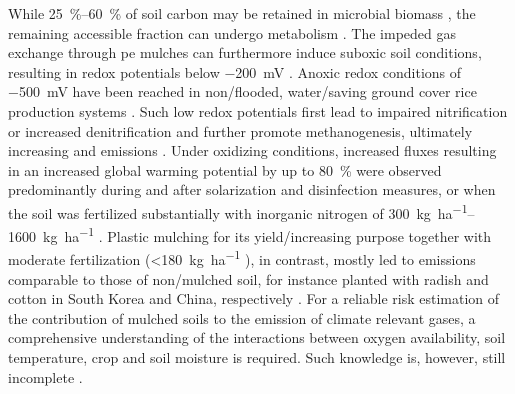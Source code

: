 While \SIrange[range-phrase = { to }]{25}{60}{\percent} of soil carbon may be retained in microbial biomass \citep{AnCarbon2015}, the remaining accessible fraction can undergo metabolism \citep{ZhouRidgefurrow2012}. The impeded gas exchange through \ac{pe} mulches can furthermore induce suboxic soil conditions, resulting in redox potentials below \SI{-200}{\milli\volt} \citep{BlokControl2000}. Anoxic redox conditions of \SI{-500}{\milli\volt} have been reached in non\-/flooded, water\-/saving ground cover rice production systems \citep{KreyeFluxes2007}. Such low redox potentials first lead to impaired nitrification or increased denitrification and further promote methanogenesis, ultimately increasing  and  emissions \citep{AkiyamaEffect2003,KimSimulation2014,LiEffects2014}. Under oxidizing conditions, increased  fluxes resulting in an increased global warming potential by up to \SI{80}{\percent} were observed predominantly during and after solarization and disinfection measures, or when the soil was fertilized substantially with inorganic nitrogen of \SIrange{300}{1600}{\kilo\gram\per\hectare}  \citep{ArriagaGaseous2011,CuelloImpact2015,NishimuraNitrous2012}. Plastic mulching for its yield\-/increasing purpose together with moderate fertilization (\SI{<180}{\kilo\gram\per\hectare} ), in contrast, mostly led to  emissions comparable to those of non\-/mulched soil, for instance planted with radish and cotton in South Korea and China, respectively \citep{BergerPlastic2013, LiEffects2014}. For a reliable risk estimation of the contribution of mulched soils to the emission of climate relevant gases, a comprehensive understanding of the interactions between oxygen availability, soil temperature, crop and soil moisture is required. Such knowledge is, however, still incomplete \citep[see for example][]{Butterbach-BahlNitrous2013,SignorNitrous2013}.

